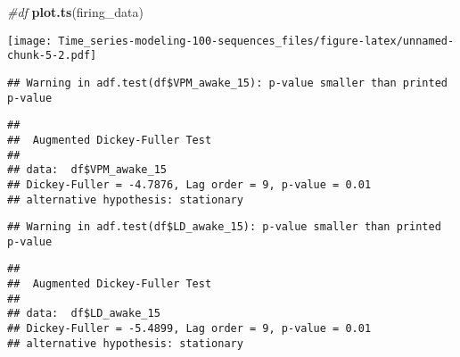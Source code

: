 \documentclass[
]{article}
\newenvironment{Shaded}{\begin{snugshade}}{\end{snugshade}}
\newcommand{\CommentTok}[1]{\textcolor[rgb]{0.56,0.35,0.01}{\textit{#1}}}
\newcommand{\FunctionTok}[1]{\textcolor[rgb]{0.13,0.29,0.53}{\textbf{#1}}}
\newcommand{\NormalTok}[1]{#1}
\newcommand{\SpecialCharTok}[1]{\textcolor[rgb]{0.81,0.36,0.00}{\textbf{#1}}}
\begin{document}
\begin{Shaded}
\begin{Highlighting}[]
\CommentTok{\#df}
\FunctionTok{plot.ts}\NormalTok{(firing\_data)}
\end{Highlighting}
\end{Shaded}

\texttt{[image: Time\_series-modeling-100-sequences\_files/figure-latex/unnamed-chunk-5-2.pdf]}

\begin{Shaded}
\end{Shaded}

\begin{verbatim}
## Warning in adf.test(df$VPM_awake_15): p-value smaller than printed p-value
\end{verbatim}

\begin{verbatim}
## 
##  Augmented Dickey-Fuller Test
## 
## data:  df$VPM_awake_15
## Dickey-Fuller = -4.7876, Lag order = 9, p-value = 0.01
## alternative hypothesis: stationary
\end{verbatim}

\begin{Shaded}
\end{Shaded}

\begin{verbatim}
## Warning in adf.test(df$LD_awake_15): p-value smaller than printed p-value
\end{verbatim}

\begin{verbatim}
## 
##  Augmented Dickey-Fuller Test
## 
## data:  df$LD_awake_15
## Dickey-Fuller = -5.4899, Lag order = 9, p-value = 0.01
## alternative hypothesis: stationary
\end{verbatim}

\begin{Shaded}
\end{Shaded}
\end{document}
